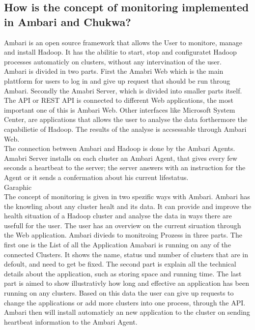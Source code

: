 \subsection{How is the concept of monitoring implemented in Ambari and Chukwa?}
Ambari is an open source framework that allows the User to monitore, manage and install Hadoop. It has the abilitie to start, stop and configuratet Hadoop processes automaticly on clusters, without any intervination of the user.
\\
Ambari is divided in two parts. First the Amabri Web which is the main plattform for users to log in and give up request that should be run throug Ambari. Secondly the Amabri Server, which is divided into smaller parts itself. The API or REST API is connected to different Web applications, the most important one of this is Ambari Web. Other interfaces like Microsoft System Center, are applications that allows the user to analyse the data forthermore the capabilietie of Hadoop. The results of the analyse is accsessable through Ambari Web.
\\
The connection between Ambari and Hadoop is done by the Ambari Agents. Amabri Server installs on each cluster an Ambari Agent, that gives every few seconds a heartbeat to the server; the server answers with an instruction for the Agent or it sends a confermation about his current lifestatus. 
\\
Garaphic 
\\ 
The concept of monitoring is given in two spezific ways with Ambari. Ambari has the knowling about any cluster healt and its data. It can provide and improve the health situation of a Hadoop cluster and analyse the data in ways there are usefull for the user. The user has an overview on the current siruation through the Web application. Ambari divieds to monitroing Prozess in three parts. The first one is the List of all the Application Amabari is running on any of the connected Clusters. It shows the name, status und number of clusters that are in defoult, and need to get be fixed. The second part is explain all the technical details about the application, such as storing space and running time. The last part is aimed to show illustrativly how long and effective an application has been running on any clusters. Based on this data the user can give up requests to change the applications or add more clusters into one process, through the API. Ambari then will install automaticly an new application to the cluster on sending heartbeat information to the Ambari Agent. 